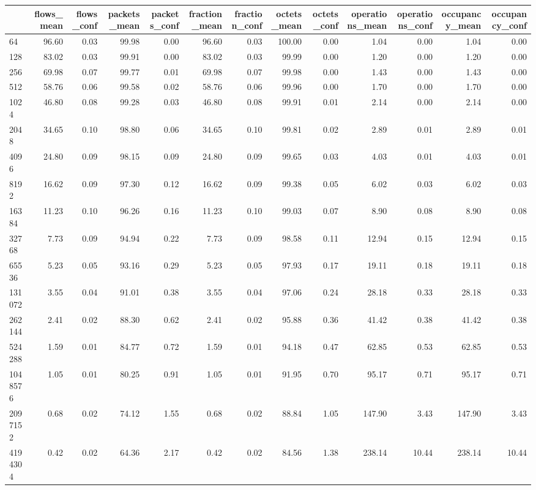 \begin{tabular}{lrrrrrrrrrrrr}
\toprule
 & flows_mean & flows_conf & packets_mean & packets_conf & fraction_mean & fraction_conf & octets_mean & octets_conf & operations_mean & operations_conf & occupancy_mean & occupancy_conf \\
\midrule
64 & 96.60 & 0.03 & 99.98 & 0.00 & 96.60 & 0.03 & 100.00 & 0.00 & 1.04 & 0.00 & 1.04 & 0.00 \\
128 & 83.02 & 0.03 & 99.91 & 0.00 & 83.02 & 0.03 & 99.99 & 0.00 & 1.20 & 0.00 & 1.20 & 0.00 \\
256 & 69.98 & 0.07 & 99.77 & 0.01 & 69.98 & 0.07 & 99.98 & 0.00 & 1.43 & 0.00 & 1.43 & 0.00 \\
512 & 58.76 & 0.06 & 99.58 & 0.02 & 58.76 & 0.06 & 99.96 & 0.00 & 1.70 & 0.00 & 1.70 & 0.00 \\
1024 & 46.80 & 0.08 & 99.28 & 0.03 & 46.80 & 0.08 & 99.91 & 0.01 & 2.14 & 0.00 & 2.14 & 0.00 \\
2048 & 34.65 & 0.10 & 98.80 & 0.06 & 34.65 & 0.10 & 99.81 & 0.02 & 2.89 & 0.01 & 2.89 & 0.01 \\
4096 & 24.80 & 0.09 & 98.15 & 0.09 & 24.80 & 0.09 & 99.65 & 0.03 & 4.03 & 0.01 & 4.03 & 0.01 \\
8192 & 16.62 & 0.09 & 97.30 & 0.12 & 16.62 & 0.09 & 99.38 & 0.05 & 6.02 & 0.03 & 6.02 & 0.03 \\
16384 & 11.23 & 0.10 & 96.26 & 0.16 & 11.23 & 0.10 & 99.03 & 0.07 & 8.90 & 0.08 & 8.90 & 0.08 \\
32768 & 7.73 & 0.09 & 94.94 & 0.22 & 7.73 & 0.09 & 98.58 & 0.11 & 12.94 & 0.15 & 12.94 & 0.15 \\
65536 & 5.23 & 0.05 & 93.16 & 0.29 & 5.23 & 0.05 & 97.93 & 0.17 & 19.11 & 0.18 & 19.11 & 0.18 \\
131072 & 3.55 & 0.04 & 91.01 & 0.38 & 3.55 & 0.04 & 97.06 & 0.24 & 28.18 & 0.33 & 28.18 & 0.33 \\
262144 & 2.41 & 0.02 & 88.30 & 0.62 & 2.41 & 0.02 & 95.88 & 0.36 & 41.42 & 0.38 & 41.42 & 0.38 \\
524288 & 1.59 & 0.01 & 84.77 & 0.72 & 1.59 & 0.01 & 94.18 & 0.47 & 62.85 & 0.53 & 62.85 & 0.53 \\
1048576 & 1.05 & 0.01 & 80.25 & 0.91 & 1.05 & 0.01 & 91.95 & 0.70 & 95.17 & 0.71 & 95.17 & 0.71 \\
2097152 & 0.68 & 0.02 & 74.12 & 1.55 & 0.68 & 0.02 & 88.84 & 1.05 & 147.90 & 3.43 & 147.90 & 3.43 \\
4194304 & 0.42 & 0.02 & 64.36 & 2.17 & 0.42 & 0.02 & 84.56 & 1.38 & 238.14 & 10.44 & 238.14 & 10.44 \\

\end{tabular}
